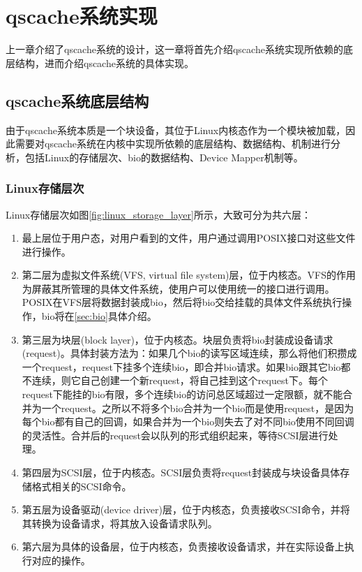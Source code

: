 
\chapter{qscache系统实现}
\label{chap:sys_implement}

上一章介绍了qscache系统的设计，这一章将首先介绍qscache系统实现所依赖的底层结构，进而介绍qscache系统的具体实现。

\section{qscache系统底层结构}

由于qscache系统本质是一个块设备，其位于Linux内核态作为一个模块被加载，因此需要对qscache系统在内核中实现所依赖的底层结构、数据结构、机制进行分析，包括Linux的存储层次、bio的数据结构、Device Mapper机制等。

\subsection{Linux存储层次}

Linux存储层次如图\ref{fig:linux_storage_layer}所示，大致可分为共六层\cite{敖青云2011存储技术原理分析}：

\begin{enumerate}[wide]
    \item 最上层位于用户态，对用户看到的文件，用户通过调用POSIX接口对这些文件进行操作。

    \item 第二层为虚拟文件系统(VFS, virtual file system)层，位于内核态。VFS的作用为屏蔽其所管理的具体文件系统，使用户可以使用统一的接口进行调用。POSIX在VFS层将数据封装成bio，然后将bio交给挂载的具体文件系统执行操作，bio将在\ref{sec:bio}具体介绍。

    \item 第三层为块层(block layer)，位于内核态。块层负责将bio封装成设备请求(request)。具体封装方法为：如果几个bio的读写区域连续，那么将他们积攒成一个request，request下挂多个连续bio，即合并bio请求。如果bio跟其它bio都不连续，则它自己创建一个新request，将自己挂到这个request下。每个request下能挂的bio有限，多个连续bio的访问总区域超过一定限额，就不能合并为一个request。之所以不将多个bio合并为一个bio而是使用request，是因为每个bio都有自己的回调，如果合并为一个bio则失去了对不同bio使用不同回调的灵活性。合并后的request会以队列的形式组织起来，等待SCSI层进行处理。

    \item 第四层为SCSI层，位于内核态。SCSI层负责将request封装成与块设备具体存储格式相关的SCSI命令。

    \item 第五层为设备驱动(device driver)层，位于内核态，负责接收SCSI命令，并将其转换为设备请求，将其放入设备请求队列。

    \item 第六层为具体的设备层，位于内核态，负责接收设备请求，并在实际设备上执行对应的操作。

\end{enumerate}

